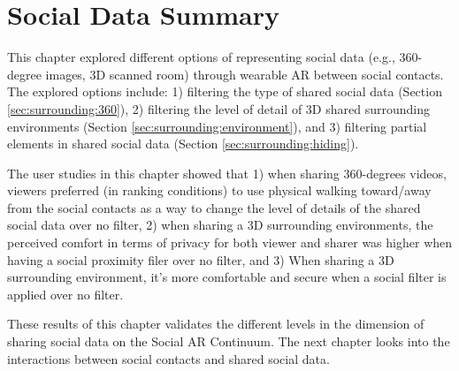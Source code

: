 \section{Social Data Summary}

This chapter explored different options of representing social data (e.g., 360-degree images, 3D scanned room) through wearable AR between social contacts. The explored options include: 1) filtering the type of shared social data (Section \ref{sec:surrounding:360}), 2) filtering the level of detail of 3D shared surrounding environments (Section \ref{sec:surrounding:environment}), and 3) filtering partial elements in shared social data (Section \ref{sec:surrounding:hiding}). 

The user studies in this chapter showed that 1) when sharing 360-degrees videos, viewers preferred (in ranking conditions) to use physical walking toward/away from the social contacts as a way to change the level of details of the shared social data over no filter, 2) when sharing a 3D surrounding environments, the perceived comfort in terms of privacy for both viewer and sharer was higher when having a social proximity filer over no filter, and 3)  When sharing a 3D surrounding environment, it's more comfortable and secure when a social filter is applied over no filter.

These results of this chapter validates the different levels in the dimension of sharing social data on the Social AR Continuum. The next chapter looks into the interactions between social contacts and shared social data. 